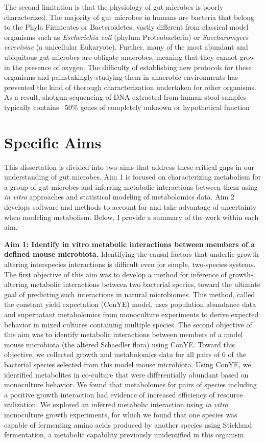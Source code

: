\documentclass[11pt,twocolumn,notitlepage,openany,twoside]{book}
\begin{document}
\begin{refsection}
The second limitation is that the physiology of gut microbes is poorly characterized. The majority of gut microbes in humans are bacteria that belong to the Phyla Firmicutes or Bacteroidetes, vastly different from classical model organisms such as \textit{Escherichia coli} (phylum Proteobacteria) or \textit{Saccharomyces cerevisiae} (a unicellular Eukaryote). Further, many of the most abundant and ubiquitous gut microbes are obligate anaerobes, meaning that they cannot grow in the presence of oxygen. The difficulty of establishing new protocols for these organisms and painstakingly studying them in anaerobic environments has prevented the kind of thorough characterization undertaken for other organisms. As a result, shotgun sequencing of DNA extracted from human stool samples typically contains ~50\% genes of completely unknown or hypothetical function \cite{Joice2014-tp}.

\section{Specific Aims}

This dissertation is divided into two aims that address these critical gaps in our understanding of gut microbes. Aim 1 is focused on characterizing metabolism for a group of gut microbes and inferring metabolic interactions between them using \textit{in vitro} approaches and statistical modeling of metabolomics data. Aim 2 develops software and methods to account for and take advantage of uncertainty when modeling metabolism. Below, I provide a summary of the work within each aim.

\textbf{Aim 1: Identify in vitro metabolic interactions between members of a defined mouse microbiota.} Identifying the causal factors that underlie growth-altering interspecies interactions is difficult even for simple, two-species systems. The first objective of this aim was to develop a method for inference of growth-altering metabolic interactions between two bacterial species, toward the ultimate goal of predicting such interactions in natural microbiomes. This method, called the constant yield expectation (ConYE) model, uses population abundance data and supernatant metabolomics from monoculture experiments to derive expected behavior in mixed cultures containing multiple species. The second objective of this aim was to identify metabolic interactions between members of a model mouse microbiota (the altered Schaedler flora) using ConYE. Toward this objective, we collected growth and metabolomics data for all pairs of 6 of the bacterial species selected from this model mouse microbiota. Using ConYE, we identified metabolites in co-culture that were differentially abundant based on monoculture behavior. We found that metabolomes for pairs of species including a positive growth interaction had evidence of increased efficiency of resource utilization. We explored an inferred metabolic interaction using \textit{in vitro} monoculture growth experiments, for which we found that one species was capable of fermenting amino acids produced by another species using Stickland fermentation, a metabolic capability previously unidentified in this organism.


\end{refsection}
\end{document}
